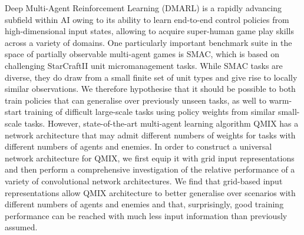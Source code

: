 Deep Multi-Agent Reinforcement Learning (DMARL) is a rapidly advancing subfield within AI owing to its ability to learn end-to-end control policies from high-dimensional input states, allowing to acquire super-human game play skills across a variety of domains. One particularly important benchmark suite in the space of partially observable multi-agent games is SMAC, which is based on challenging StarCraftII unit micromanagement tasks. 
While SMAC tasks are diverse, they do draw from a small finite set of unit types and give rise to locally similar observations. We therefore hypothesise that it should be possible to both train policies that can generalise over previously unseen tasks, as well to warm-start training of difficult large-scale tasks using policy weights from similar small-scale tasks.
However, state-of-the-art multi-agent learning algorithm QMIX has a network architecture that may admit different numbers of weights for tasks with different numbers of agents and enemies.  
In order to construct a universal network architecture for QMIX, we first equip it with grid input representations and then perform a comprehensive investigation of the relative performance of a variety of convolutional network architectures. We find that grid-based input representations allow QMIX architecture to better generalise over scenarios with different numbers of agents and enemies and that, surprisingly, good training performance can be reached with much less input information than previously assumed.